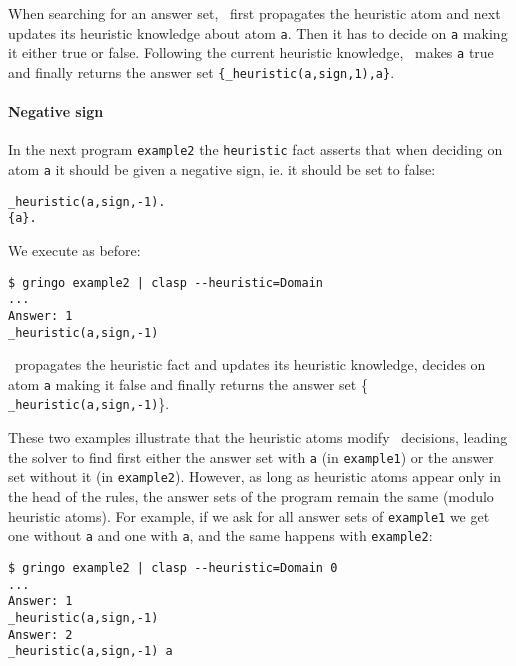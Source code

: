 When searching for an answer set, \clasp\ first propagates the heuristic atom and next updates its heuristic knowledge about atom \texttt{a}. 
Then it has to decide on \texttt{a} making it either true or false. 
Following the current heuristic knowledge,  \clasp\ makes \texttt{a} true and finally returns the answer set \texttt{\{\_heuristic(a,sign,1),a\}}. 

\paragraph{Negative sign}

In the next program \texttt{example2} the \texttt{heuristic} fact  asserts that when deciding on atom \texttt{a}  
it should be given a negative sign, ie. it should be set to false: 
\begin{verbatim}
_heuristic(a,sign,-1).
{a}.
\end{verbatim}
We execute as before:
\begin{verbatim}
$ gringo example2 | clasp --heuristic=Domain                                                              
...
Answer: 1                                                                                                           
_heuristic(a,sign,-1)
\end{verbatim}
\clasp\ propagates the heuristic fact and updates its heuristic knowledge, 
decides on atom \texttt{a} making it false and finally returns the answer set \{ \texttt{\_heuristic(a,sign,-1)}\}. 

These two examples illustrate that the heuristic atoms modify \clasp\ decisions,  
leading the solver to find first either the answer set with \texttt{a} (in \texttt{example1}) or the answer set without it (in \texttt{example2}). 
However, as long as heuristic atoms appear only in the head of the rules, 
the answer sets of the program remain the same (modulo heuristic atoms). 
For example, if we ask for all answer sets of \texttt{example1}  we get one without \texttt{a} and one with \texttt{a},  
and the same happens with \texttt{example2}: 
\begin{verbatim}
$ gringo example2 | clasp --heuristic=Domain 0                                                                                
...
Answer: 1                                                                                                           
_heuristic(a,sign,-1)
Answer: 2                                                                                                           
_heuristic(a,sign,-1) a
\end{verbatim}

